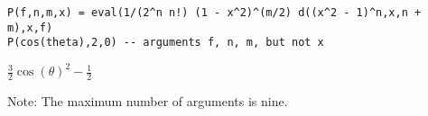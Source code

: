 \begin{enumerate}
\begin{Verbatim}[formatcom=\color{blue}]
P(f,n,m,x) = eval(1/(2^n n!) (1 - x^2)^(m/2) d((x^2 - 1)^n,x,n + m),x,f)
P(cos(theta),2,0) -- arguments f, n, m, but not x
\end{Verbatim}

\noindent
$\displaystyle \tfrac{3}{2} \cos(\theta)^2-\tfrac{1}{2}$

\bigskip
\noindent
Note: The maximum number of arguments is nine.

\end{enumerate}
